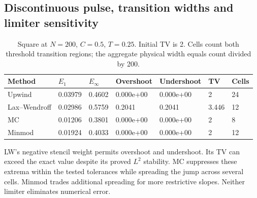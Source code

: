 \subsection{Discontinuous pulse, transition widths and limiter sensitivity}
\begin{table}[htbp]\centering\small
\caption{Square at $N=200$, $C=0.5$, $T=0.25$. Initial TV is 2. Cells count both threshold transition regions; the aggregate physical width equals count divided by 200.}\label{tab:square}
\begin{tabular}{lllllll}
\toprule
Method & $E_1$ & $E_\infty$ & Overshoot & Undershoot & TV & Cells\\\midrule
Upwind & 0.03979 & 0.4602 & 0.000e+00 & 0.000e+00 & 2 & 24\\
Lax--Wendroff & 0.02986 & 0.5759 & 0.2041 & 0.2041 & 3.446 & 12\\
MC & 0.01206 & 0.3801 & 0.000e+00 & 0.000e+00 & 2 & 8\\
Minmod & 0.01924 & 0.4033 & 0.000e+00 & 0.000e+00 & 2 & 12\\
\bottomrule\end{tabular}\end{table}
LW's negative stencil weight permits overshoot and undershoot. Its TV can exceed the exact value despite its proved $L^2$ stability. MC suppresses these extrema within the tested tolerances while spreading the jump across several cells. Minmod trades additional spreading for more restrictive slopes. Neither limiter eliminates numerical error.

